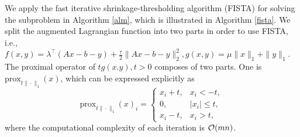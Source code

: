 \documentclass{article}
\newcommand{\prox}{\mathrm{prox}}
\newcommand{\proj}{\mathrm{proj}}
\begin{document}
 We apply the fast iterative shrinkage-thresholding algorithm (FISTA) \cite{beck2009fast} for solving the subproblem in Algorithm \ref{alm}, which is illustrated in Algorithm \ref{fista}. We split the augmented Lagrangian function into two parts in order to use FISTA, i.e., $f(x,y) = \lambda^\top(Ax-b-y)+\frac{\tau}{2}\|Ax-b-y\|_2^2,g(x,y)=\mu\|x\|_1+\|y\|_1$. The proximal operator of $tg(x.y),t>0$ composes of two parts. One is $\prox_{t\|\cdot\|_1}(x)$, which can be expressed explicitly as
 \begin{equation}
\prox_{t\|\cdot\|_1}(x)_i = \begin{cases}
x_i+t,&x_i <-t, \\
0, & |x_i|\le t,\\
x_i-t, & x_i > t,
\end{cases}
 \end{equation}
where the computational complexity of each iteration is $\mathcal O(mn)$.
\end{document}
